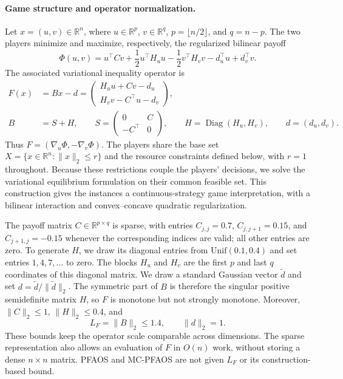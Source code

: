 \paragraph{Game structure and operator normalization.}
Let $x=(u,v)\in\mathbb R^n$, where
$u\in\mathbb R^{p}$, $v\in\mathbb R^{q}$,
$p=\lfloor n/2\rfloor$, and $q=n-p$. The two players minimize and maximize,
respectively, the regularized bilinear payoff
\begin{equation}\label{eq:numerical_game}
\Phi(u,v)=u^\top Cv+\frac12u^\top H_u u
-\frac12v^\top H_v v-d_u^\top u+d_v^\top v.
\end{equation}
The associated variational inequality operator is
\begin{equation}\label{eq:numerical_operator}
\begin{aligned}
F(x)&=Bx-d
=\begin{pmatrix}H_u u+Cv-d_u\\ H_vv-C^\top u-d_v\end{pmatrix},\\
B&=S+H,\qquad
S=\begin{pmatrix}0&C\\-C^\top&0\end{pmatrix},\qquad
H=\operatorname{Diag}(H_u,H_v),\qquad d=(d_u,d_v).
\end{aligned}
\end{equation}
Thus $F=(\nabla_u\Phi,-\nabla_v\Phi)$. The players share the base set
$X=\{x\in\mathbb R^n:\|x\|_2\le r\}$ and the resource constraints
defined below, with $r=1$ throughout. Because these restrictions couple the
players' decisions, we solve the variational equilibrium formulation on
their common feasible set. This construction gives the instances a
continuous-strategy game interpretation, with a bilinear interaction and
convex--concave quadratic regularization.

The payoff matrix $C\in\mathbb R^{p\times q}$ is sparse, with entries
$C_{j,j}=0.7$, $C_{j,j+1}=0.15$, and $C_{j+1,j}=-0.15$ whenever the
corresponding indices are valid; all other entries are zero. To generate
$H$, we draw its diagonal entries from $\mathrm{Unif}(0.1,0.4)$ and set
entries $1,4,7,\ldots$ to zero. The blocks $H_u$ and $H_v$ are the first
$p$ and last $q$ coordinates of this diagonal matrix. We draw a standard
Gaussian vector $\widetilde d$ and set
$d=\widetilde d/\|\widetilde d\|_2$.
The symmetric part of $B$ is therefore the singular positive semidefinite
matrix $H$, so $F$ is monotone but not strongly monotone. Moreover,
$\|C\|_2\le1$, $\|H\|_2\le0.4$, and
\[
L_F=\|B\|_2\le1.4,\qquad \|d\|_2=1.
\]
These bounds keep the operator scale comparable across dimensions. The
sparse representation also allows an evaluation of $F$ in $O(n)$ work,
without storing a dense $n\times n$ matrix. PFAOS and MC-PFAOS are not given
$L_F$ or its construction-based bound.

